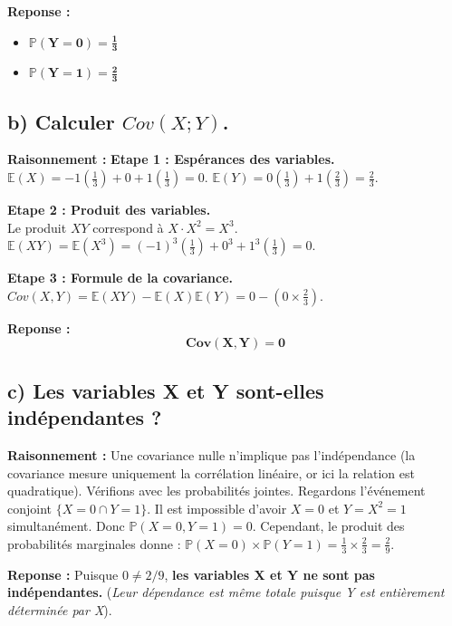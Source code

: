 \documentclass[11pt,a4paper]{article}
\begin{document}
\textbf{Reponse :}
\begin{itemize}
    \item $\mathbf{\mathbb{P}(Y=0) = \frac{1}{3}}$
    \item $\mathbf{\mathbb{P}(Y=1) = \frac{2}{3}}$
\end{itemize}

\subsection*{b) Calculer $Cov(X;Y)$.}

\textbf{Raisonnement :} 
\textbf{Etape 1 : Espérances des variables.}\\
$\mathbb{E}(X) = -1\left(\frac{1}{3}\right) + 0 + 1\left(\frac{1}{3}\right) = 0$.
$\mathbb{E}(Y) = 0\left(\frac{1}{3}\right) + 1\left(\frac{2}{3}\right) = \frac{2}{3}$.

\textbf{Etape 2 : Produit des variables.}\\
Le produit $XY$ correspond à $X \cdot X^2 = X^3$.
$\mathbb{E}(XY) = \mathbb{E}(X^3) = (-1)^3\left(\frac{1}{3}\right) + 0^3 + 1^3\left(\frac{1}{3}\right) = 0$.

\textbf{Etape 3 : Formule de la covariance.}\\
$Cov(X,Y) = \mathbb{E}(XY) - \mathbb{E}(X)\mathbb{E}(Y) = 0 - \left(0 \times \frac{2}{3}\right)$.

\textbf{Reponse :}
$$ \mathbf{Cov(X,Y) = 0} $$

\subsection*{c) Les variables X et Y sont-elles indépendantes ?}

\textbf{Raisonnement :} 
Une covariance nulle n'implique pas l'indépendance (la covariance mesure uniquement la corrélation linéaire, or ici la relation est quadratique).
Vérifions avec les probabilités jointes. Regardons l'événement conjoint $\{X=0 \cap Y=1\}$.
Il est impossible d'avoir $X=0$ et $Y=X^2=1$ simultanément. Donc $\mathbb{P}(X=0, Y=1) = 0$.
Cependant, le produit des probabilités marginales donne : $\mathbb{P}(X=0) \times \mathbb{P}(Y=1) = \frac{1}{3} \times \frac{2}{3} = \frac{2}{9}$.

\textbf{Reponse :}
Puisque $0 \neq 2/9$, \textbf{les variables X et Y ne sont pas indépendantes.} (\textit{Leur dépendance est même totale puisque Y est entièrement déterminée par X}).
\end{document}
